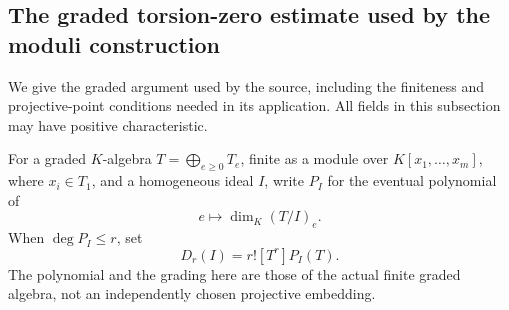 \subsection{The graded torsion-zero estimate used by the moduli construction}
\label{subsec:ftb-torsion-zero-estimate}

We give the graded argument used by the source, including the
finiteness and projective-point conditions needed in its application.
All fields in this subsection may have positive characteristic.

For a graded \(K\)-algebra \(T=\bigoplus_{e\ge0}T_e\), finite
as a module over \(K[x_1,\ldots,x_m]\), where \(x_i\in T_1\),
and a homogeneous ideal \(I\), write \(P_I\) for the eventual
polynomial of
\[
                  e\longmapsto\dim_K(T/I)_e.
\]
When \(\deg P_I\le r\), set
\[
                         D_r(I)=r![T^r]P_I(T).
 \tag{TZ1}\label{eq:ftb-graded-degree}
\]
The polynomial and the grading here are those of the actual finite
graded algebra, not an independently chosen projective embedding.

